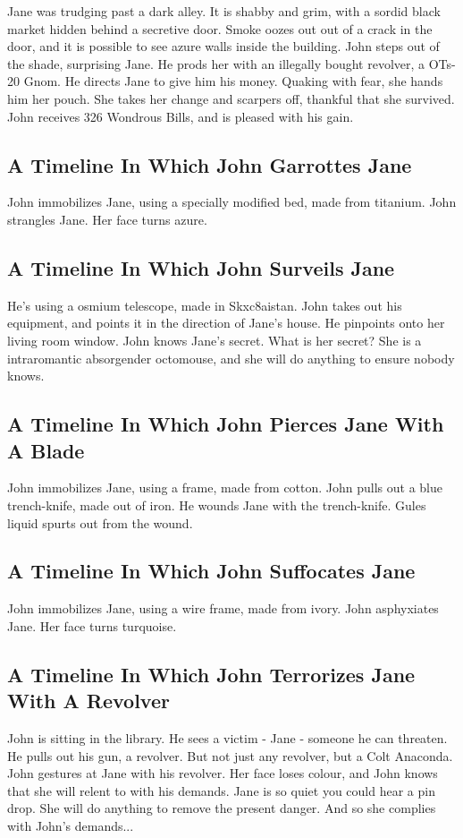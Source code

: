 \documentclass{article}
\begin{document}
Jane was trudging past a dark alley.
It is shabby and grim, with a sordid black market hidden behind a secretive door.
Smoke oozes out out of a crack in the door, and it is possible to see azure walls inside the building.
John steps out of the shade, surprising Jane.
He prods her with an illegally bought revolver, a OTs{-}20 Gnom.
He directs Jane to give him his money.
Quaking with fear, she hands him her pouch.
She takes her change and scarpers off, thankful that she survived.
John receives 326 Wondrous Bills, and is pleased with his gain.
\subsection{A Timeline In Which John Garrottes Jane}


John immobilizes Jane, using a specially modified bed, made from titanium.
John strangles Jane.
Her face turns azure.
\subsection{A Timeline In Which John Surveils Jane}


He's using a osmium telescope, made in Skxc8aistan.
John takes out his equipment, and points it in the direction of Jane's house. He pinpoints onto her living room window.
John knows Jane's secret. What is her secret? She is a intraromantic absorgender octomouse, and she will do anything to ensure nobody knows.
\subsection{A Timeline In Which John Pierces Jane With A Blade}


John immobilizes Jane, using a frame, made from cotton.
John pulls out a blue trench{-}knife, made out of iron.
He wounds Jane with the trench{-}knife.
Gules liquid spurts out from the wound.
\subsection{A Timeline In Which John Suffocates Jane}


John immobilizes Jane, using a wire frame, made from ivory.
John asphyxiates Jane.
Her face turns turquoise.
\subsection{A Timeline In Which John Terrorizes Jane With A Revolver}


John is sitting in the library.
He sees a victim {-} Jane {-} someone he can threaten. He pulls out his gun, a revolver.
But not just any revolver, but a Colt Anaconda.
John gestures at Jane with his revolver. Her face loses colour, and John knows that she will relent to with his demands.
Jane is so quiet you could hear a pin drop. She will do anything to remove the present danger. And so she complies with John's demands...
\end{document}
